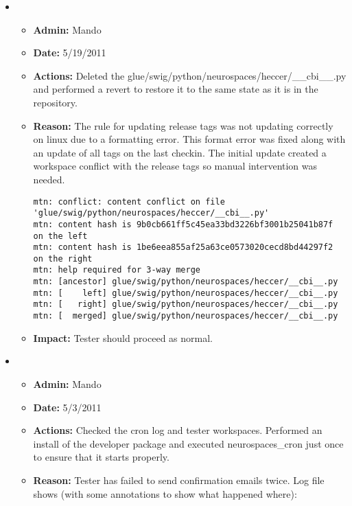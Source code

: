 \documentclass[12pt]{article}
\begin{document}
\begin{itemize}
  
\item
  \begin{itemize}
  \item[] {\bf Admin:} Mando
  \item[] {\bf Date:} 5/19/2011
  \item[] {\bf Actions:} Deleted the
    glue/swig/python/neurospaces/heccer/\_\_cbi\_\_.py and performed a
    revert to restore it to the same state as it is in the repository.
  \item[] {\bf Reason:} The rule for updating release tags was not
    updating correctly on linux due to a formatting error. This format
    error was fixed along with an update of all tags on the last
    checkin.  The initial update created a workspace conflict with the
    release tags so manual intervention was needed.
  
  \begin{verbatim}
mtn: conflict: content conflict on file 'glue/swig/python/neurospaces/heccer/__cbi__.py'
mtn: content hash is 9b0cb661ff5c45ea33bd3226bf3001b25041b87f on the left
mtn: content hash is 1be6eea855af25a63ce0573020cecd8bd44297f2 on the right
mtn: help required for 3-way merge
mtn: [ancestor] glue/swig/python/neurospaces/heccer/__cbi__.py
mtn: [    left] glue/swig/python/neurospaces/heccer/__cbi__.py
mtn: [   right] glue/swig/python/neurospaces/heccer/__cbi__.py
mtn: [  merged] glue/swig/python/neurospaces/heccer/__cbi__.py
  \end{verbatim}
  
  \item[] {\bf Impact:} Tester should proceed as normal. 
  \end{itemize}

\item
  \begin{itemize}
  \item[] {\bf Admin:} Mando
  \item[] {\bf Date:} 5/3/2011 
  \item[] {\bf Actions:} Checked the cron log and tester workspaces. Performed an install of the developer package and executed neurospaces\_cron just once to ensure that it starts properly.
  \item[] {\bf Reason:} Tester has failed to send confirmation emails twice. Log file shows (with some annotations to show what happened where):
  

\end{itemize}
\end{itemize}
\end{document}
